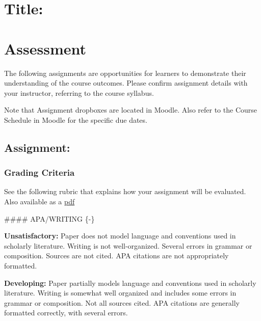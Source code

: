 \documentclass[
]{book}
\begin{document}
\hypertarget{title}{%
\chapter{Title:}\label{title}}

\hypertarget{assessment-10}{%
\chapter*{Assessment}\label{assessment-10}}

The following assignments are opportunities for learners to demonstrate their understanding of the course outcomes. Please confirm assignment details with your instructor, referring to the course syllabus.

Note that Assignment dropboxes are located in Moodle. Also refer to the Course Schedule in Moodle for the specific due dates.

\hypertarget{assignment-4}{%
\section*{Assignment:}\label{assignment-4}}

\begin{assessment}

\end{assessment}

\hypertarget{grading-criteria-7}{%
\subsection*{Grading Criteria}\label{grading-criteria-7}}

See the following rubric that explains how your assignment will be evaluated. Also available as a \href{assets/assessment/Identity-as-a-Teacher-RUBRIC.pdf}{pdf}

\#\#\#\# APA/WRITING \{-\}

\textbf{Unsatisfactory:} Paper does not model language and conventions used in scholarly literature. Writing is not well-organized. Several errors in grammar or composition. Sources are not cited. APA citations are not appropriately formatted.

\textbf{Developing:} Paper partially models language and conventions used in scholarly literature. Writing is somewhat well organized and includes some errors in grammar or composition. Not all sources cited. APA citations are generally formatted correctly, with several errors.
\end{document}
